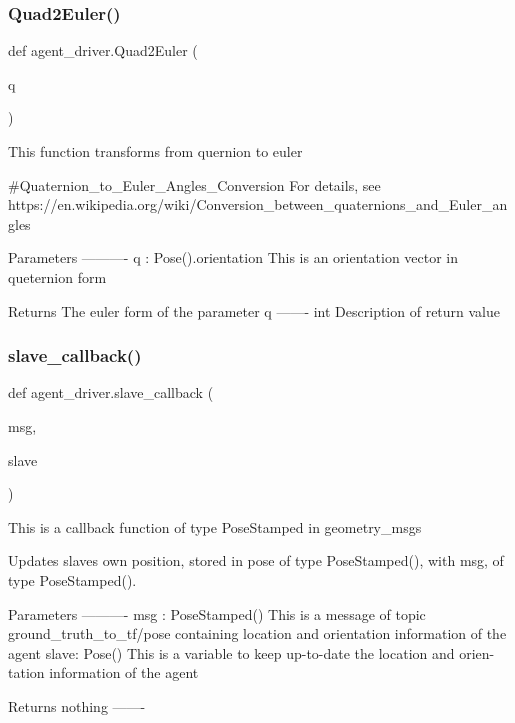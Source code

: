 \subsubsection{\texorpdfstring{Quad2\+Euler()}{Quad2Euler()}}
{\footnotesize\ttfamily def agent\+\_\+driver.\+Quad2\+Euler (\begin{DoxyParamCaption}\item[{}]{q }\end{DoxyParamCaption})}

\begin{DoxyVerb}This function transforms from quernion to euler

#Quaternion_to_Euler_Angles_Conversion
For details, see https://en.wikipedia.org/wiki/Conversion_between_quaternions_and_Euler_angles

Parameters
----------
q : Pose().orientation
    This is an orientation vector in queternion form

Returns
    The euler form of the parameter q
-------
int
    Description of return value
\end{DoxyVerb}
 \mbox{\label{namespaceagent__driver_a8533f9b2a436a7a18b583d2a3cdd2bb0}} 
\subsubsection{\texorpdfstring{slave\+\_\+callback()}{slave\_callback()}}
{\footnotesize\ttfamily def agent\+\_\+driver.\+slave\+\_\+callback (\begin{DoxyParamCaption}\item[{}]{msg,  }\item[{}]{slave }\end{DoxyParamCaption})}

\begin{DoxyVerb}This is a callback function of type PoseStamped in geometry_msgs

Updates slaves own position, stored in pose of type PoseStamped(),
with msg, of type PoseStamped().

Parameters
----------
msg : PoseStamped()
        This is a message of topic ground_truth_to_tf/pose containing
        location and orientation information of the agent
slave: Pose()
        This is a variable to keep up-to-date the location and orien-
        tation information of the agent

Returns
    nothing
-------
\end{DoxyVerb}
 

